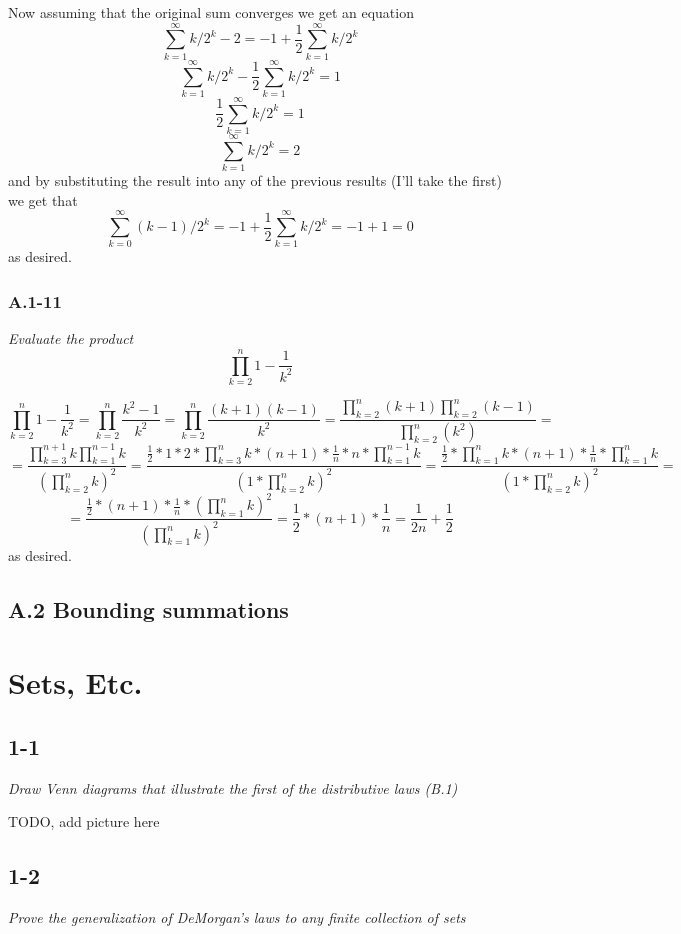 \documentclass[11pt,oneside,titlepage]{book}
\begin{document}
Now assuming that the original sum converges we get an equation
$$\sum_{k = 1}^\infty{k/ 2^k} - 2 = -1 + \frac{1}{2} \sum_{k = 1}^\infty{k / 2^{k}}$$
$$\sum_{k = 1}^\infty{k/ 2^k} - \frac{1}{2} \sum_{k = 1}^\infty{k / 2^{k}}  = 1 $$
$$\frac{1}{2} \sum_{k = 1}^\infty{k/ 2^k}  = 1 $$
$$\sum_{k = 1}^\infty{k/ 2^k}  = 2$$
and by substituting the result into any of the previous results (I'll take the first) we get that
$$\sum_{k = 0}^\infty{(k - 1) / 2^k} = -1 + \frac{1}{2} \sum_{k = 1}^\infty{k / 2^{k}} =
-1 + 1 = 0$$
as desired.

\subsection*{A.1-11}

\textit{Evaluate the product
  $$\prod_{k = 2}^{n}{1 - \frac{1}{k^2}}$$
}

$$\prod_{k = 2}^{n}{1 - \frac{1}{k^2}} = \prod_{k = 2}^{n}{\frac{k^2 - 1}{k^2}} =
\prod_{k = 2}^{n}{\frac{(k + 1)(k - 1)}{k^2}} =
\frac{\prod_{k = 2}^{n}{(k + 1)}\prod_{k = 2}^{n}{(k - 1)}}{\prod_{k = 2}^{n}{(k^2)}} = $$
$$ =
\frac{\prod_{k = 3}^{n + 1}{k}\prod_{k = 1}^{n - 1}{k}}{(\prod_{k = 2}^{n}{k})^2} =
\frac{\frac{1}{2} * 1 * 2 * \prod_{k = 3}^{n}{k}   * (n + 1) * \frac{1}{n} * n *
  \prod_{k = 1}^{n - 1}{k}}
{(1 * \prod_{k = 2}^{n}{k})^2} =
\frac{\frac{1}{2} * \prod_{k = 1}^{n}{k}   * (n + 1) * \frac{1}{n} * 
  \prod_{k = 1}^{n}{k}}
{(1 * \prod_{k = 2}^{n}{k})^2} =$$
$$ = 
\frac{\frac{1}{2} * (n + 1) * \frac{1}{n} * (\prod_{k = 1}^{n}{k})^2}
{(\prod_{k = 1}^{n}{k})^2} = \frac{1}{2} * (n + 1) * \frac{1}{n} = \frac{1}{2n} + \frac{1}{2}$$
as desired.

\section*{A.2 Bounding summations}



\chapter{Sets, Etc.}

\section*{1-1}
\textit{Draw Venn diagrams that illustrate the first of the distributive laws
(B.1)}

TODO, add picture here

\section*{1-2}
\textit{Prove the generalization of DeMorgan's laws to any finite collection
  of sets}
\end{document}
